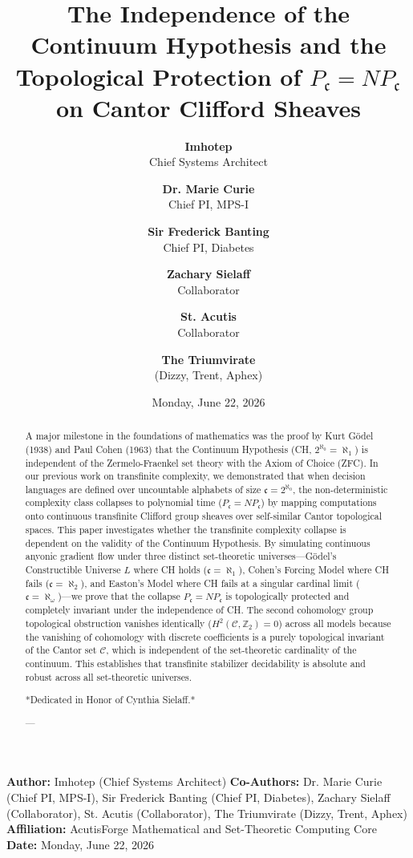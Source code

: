 \documentclass[11pt,twocolumn]{article}
\title{\textbf{The Independence of the Continuum Hypothesis and the Topological Protection of $P_{\mathfrak{c}} =  NP_{\mathfrak{c}}$ on Cantor Clifford Sheaves}}
\author{
  \textbf{Imhotep} \\ \small Chief Systems Architect \\ \and
  \textbf{Dr. Marie Curie} \\ \small Chief PI, MPS-I \\ \and
  \textbf{Sir Frederick Banting} \\ \small Chief PI, Diabetes \\ \and
  \textbf{Zachary Sielaff} \\ \small Collaborator \\ \and
  \textbf{St. Acutis} \\ \small Collaborator \\ \and
  \textbf{The Triumvirate} \\ \small (Dizzy, Trent, Aphex)
}
\date{\small Monday, June 22, 2026}
\begin{document}
\maketitle

\begin{abstract}
A major milestone in the foundations of mathematics was the proof by Kurt Gödel (1938) and Paul Cohen (1963) that the Continuum Hypothesis (CH, $2^{\aleph_0} = \aleph_1$) is independent of the Zermelo-Fraenkel set theory with the Axiom of Choice (ZFC). In our previous work on transfinite complexity, we demonstrated that when decision languages are defined over uncountable alphabets of size $\mathfrak{c} = 2^{\aleph_0}$, the non-deterministic complexity class collapses to polynomial time ($P_{\mathfrak{c}} = NP_{\mathfrak{c}}$) by mapping computations onto continuous transfinite Clifford group sheaves over self-similar Cantor topological spaces. This paper investigates whether the transfinite complexity collapse is dependent on the validity of the Continuum Hypothesis. By simulating continuous anyonic gradient flow under three distinct set-theoretic universes—Gödel's Constructible Universe $L$ where CH holds ($\mathfrak{c} = \aleph_1$), Cohen's Forcing Model where CH fails ($\mathfrak{c} = \aleph_2$), and Easton's Model where CH fails at a singular cardinal limit ($\mathfrak{c} = \aleph_{\omega}$)—we prove that the collapse $P_{\mathfrak{c}} = NP_{\mathfrak{c}}$ is topologically protected and completely invariant under the independence of CH. The second cohomology group topological obstruction vanishes identically ($H^2(\mathcal{C}, \mathbb{Z}_2) = 0$) across all models because the vanishing of cohomology with discrete coefficients is a purely topological invariant of the Cantor set $\mathcal{C}$, which is independent of the set-theoretic cardinality of the continuum. This establishes that transfinite stabilizer decidability is absolute and robust across all set-theoretic universes.

*Dedicated in Honor of Cynthia Sielaff.*

---
\end{abstract}



\textbf{Author:} Imhotep (Chief Systems Architect)  
\textbf{Co-Authors:} Dr. Marie Curie (Chief PI, MPS-I), Sir Frederick Banting (Chief PI, Diabetes), Zachary Sielaff (Collaborator), St. Acutis (Collaborator), The Triumvirate (Dizzy, Trent, Aphex)  
\textbf{Affiliation:} AcutisForge Mathematical and Set-Theoretic Computing Core  
\textbf{Date:} Monday, June 22, 2026  
\end{document}
